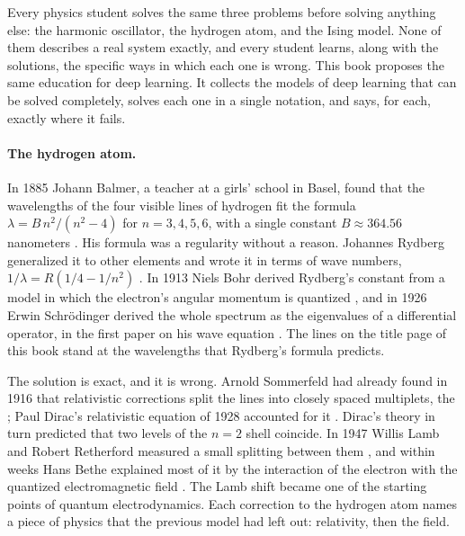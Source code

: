 \label{ch:prologue}
\begin{refsection}

Every physics student solves the same three problems before solving anything else: the harmonic oscillator, the hydrogen atom, and the Ising model. None of them describes a real system exactly, and every student learns, along with the solutions, the specific ways in which each one is wrong. This book proposes the same education for deep learning. It collects the models of deep learning that can be solved completely, solves each one in a single notation, and says, for each, exactly where it fails.


\paragraph{The hydrogen atom.} In 1885 Johann Balmer, a teacher at a girls' school in Basel, found that the wavelengths of the four visible lines of hydrogen fit the formula $\lambda = B\,n^2/(n^2-4)$ for $n=3,4,5,6$, with a single constant $B\approx364.56$ nanometers \parencite{Balmer1885}. His formula was a regularity without a reason. Johannes Rydberg generalized it to other elements and wrote it in terms of wave numbers, $1/\lambda = R(1/4-1/n^2)$ \parencite{Rydberg1890}. In 1913 Niels Bohr derived Rydberg's constant from a model in which the electron's angular momentum is quantized \parencite{Bohr1913}, and in 1926 Erwin Schr\"odinger derived the whole spectrum as the eigenvalues of a differential operator, in the first paper on his wave equation \parencite{Schrodinger1926}. The lines on the title page of this book stand at the wavelengths that Rydberg's formula predicts.

The solution is exact, and it is wrong. Arnold Sommerfeld had already found in 1916 that relativistic corrections split the lines into closely spaced multiplets, the  \parencite{Sommerfeld1916}; Paul Dirac's relativistic equation of 1928 accounted for it \parencite{Dirac1928}. Dirac's theory in turn predicted that two levels of the $n=2$ shell coincide. In 1947 Willis Lamb and Robert Retherford measured a small splitting between them \parencite{LambRetherford1947}, and within weeks Hans Bethe explained most of it by the interaction of the electron with the quantized electromagnetic field \parencite{Bethe1947}. The Lamb shift became one of the starting points of quantum electrodynamics. Each correction to the hydrogen atom names a piece of physics that the previous model had left out: relativity, then the field.


\end{refsection}
